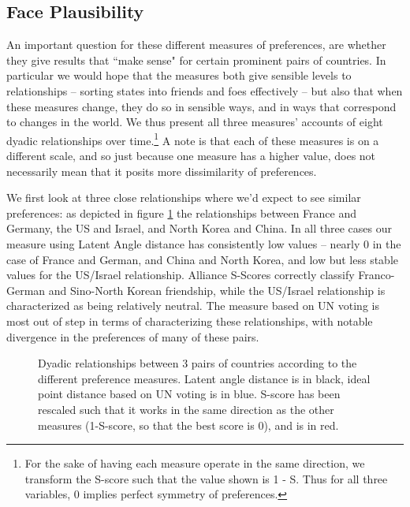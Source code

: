 \subsection{Face Plausibility}
An important question for these different measures of preferences, are whether they give results that ``make sense" for certain prominent pairs of countries. In particular we would hope that the measures both give sensible levels to relationships -- sorting states into friends and foes effectively -- but also that when these measures change, they do so in sensible ways, and in ways that correspond to changes in the world. We thus present all three measures' accounts of eight dyadic relationships over time.\footnote{For the sake of having each measure operate in the same direction, we transform the S-score such that the value shown is 1 - S. Thus for all three variables, $0$ implies perfect symmetry of preferences.} A note is that each of these measures is on a different scale, and so just because one measure has a higher value, does not necessarily mean that it posits more dissimilarity of preferences.

We first look at three close relationships where we'd expect to see similar preferences: as depicted in figure \ref{friendly:dyads} the relationships between France and Germany, the US and Israel, and North Korea and China. In all three cases our measure using Latent Angle distance has consistently low values -- nearly $0$ in the case of France and German, and China and North Korea, and low but less stable values for the US/Israel relationship. Alliance S-Scores correctly classify Franco-German and Sino-North Korean friendship, while the US/Israel relationship is characterized as being relatively neutral. The measure based on UN voting is most out of step in terms of characterizing these relationships, with notable divergence in the preferences of many of these pairs.

\begin{figure}
\caption{Dyadic relationships between 3 pairs of countries according to the different preference measures. Latent angle distance is in black, ideal point distance based on UN voting is in blue. S-score has been rescaled such that it works in the same direction as the other measures (1-S-score, so that the best score is 0), and is in red.}
\label{friendly:dyads}
\end{figure}

